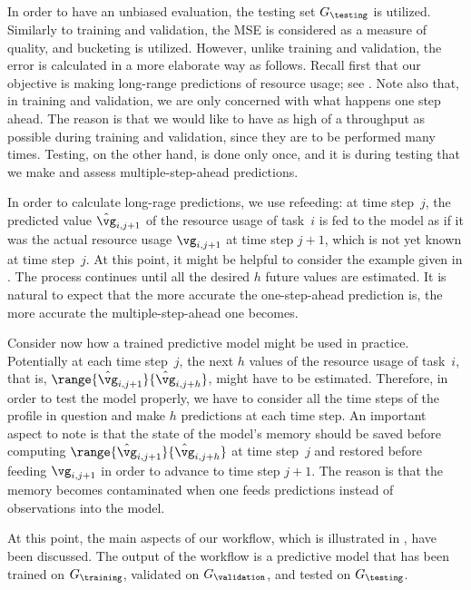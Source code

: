 In order to have an unbiased evaluation, the testing set $G_\testing$ is
utilized. Similarly to training and validation, the \ac{MSE} is considered as a
measure of quality, and bucketing is utilized. However, unlike training and
validation, the error is calculated in a more elaborate way as follows. Recall
first that our objective is making long-range predictions of resource usage; see
. Note also that, in training and validation, we are only
concerned with what happens one step ahead. The reason is that we would like to
have as high of a throughput as possible during training and validation, since
they are to be performed many times. Testing, on the other hand, is done only
once, and it is during testing that we make and assess multiple-step-ahead
predictions.

In order to calculate long-rage predictions, we use refeeding: at time step~$j$,
the predicted value $\hat{\vg}_{i, j + 1}$ of the resource usage of task~$i$ is
fed to the model as if it was the actual resource usage $\vg_{i, j + 1}$ at time
step $j + 1$, which is not yet known at time step~$j$. At this point, it might
be helpful to consider the example given in . The
process continues until all the desired $h$ future values are estimated. It is
natural to expect that the more accurate the one-step-ahead prediction is, the
more accurate the multiple-step-ahead one becomes.

Consider now how a trained predictive model might be used in practice.
Potentially at each time step~$j$, the next $h$ values of the resource usage of
task~$i$, that is, $\range{\hat{\vg}_{i, j + 1}}{\hat{\vg}_{i, j + h}}$, might
have to be estimated. Therefore, in order to test the model properly, we have to
consider all the time steps of the profile in question and make $h$ predictions
at each time step. An important aspect to note is that the state of the model's
memory should be saved before computing $\range{\hat{\vg}_{i, j +
1}}{\hat{\vg}_{i, j + h}}$ at time step~$j$ and restored before feeding $\vg_{i,
j + 1}$ in order to advance to time step $j + 1$. The reason is that the memory
becomes contaminated when one feeds predictions instead of observations into the
model.

At this point, the main aspects of our workflow, which is illustrated in
, have been discussed. The output of the workflow is a
predictive model that has been trained on $G_\training$, validated on
$G_\validation$, and tested on $G_\testing$.
